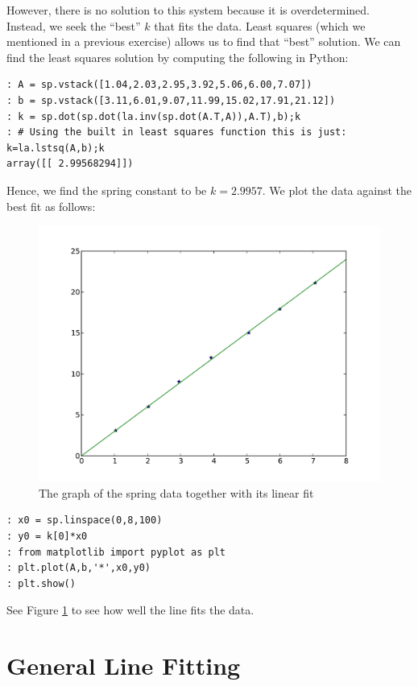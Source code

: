 However, there is no solution to this system because it is overdetermined.  Instead, we seek the ``best'' $k$ that fits the data.  Least squares (which we mentioned in a previous exercise) allows us to find that ``best'' solution. We can find the least squares solution by computing the following in Python:
\begin{lstlisting}[style=python]
: A = sp.vstack([1.04,2.03,2.95,3.92,5.06,6.00,7.07])
: b = sp.vstack([3.11,6.01,9.07,11.99,15.02,17.91,21.12])
: k = sp.dot(sp.dot(la.inv(sp.dot(A.T,A)),A.T),b);k
: # Using the built in least squares function this is just: k=la.lstsq(A,b);k
array([[ 2.99568294]])
\end{lstlisting}
Hence, we find the spring constant to be $k = 2.9957$.  We plot the data against the best fit as follows:
\begin{figure}[h!]
\label{fig1}
\begin{center}
\includegraphics[scale = .6]{lab9_line_py}
\caption{The graph of the spring data together with its linear fit}
\label{Fig:SpringFit}
\end{center}
\end{figure}

\begin{lstlisting}[style=python]
: x0 = sp.linspace(0,8,100)
: y0 = k[0]*x0
: from matplotlib import pyplot as plt
: plt.plot(A,b,'*',x0,y0)
: plt.show()
\end{lstlisting}
See Figure \ref{Fig:SpringFit} to see how well the line fits the data.


\section*{General Line Fitting}

